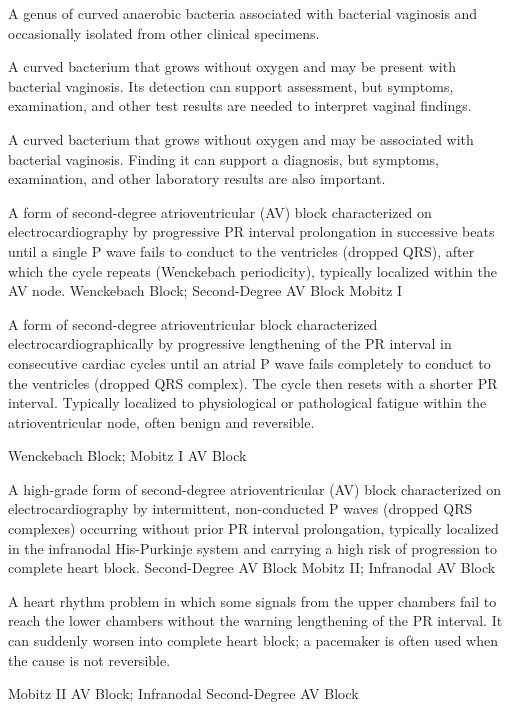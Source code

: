  A genus of curved anaerobic bacteria associated with bacterial vaginosis and occasionally isolated from other clinical specimens.

 A curved bacterium that grows without oxygen and may be present with bacterial vaginosis. Its detection can support assessment, but symptoms, examination, and other test results are needed to interpret vaginal findings.

 A curved bacterium that grows without oxygen and may be associated with bacterial vaginosis. Finding it can support a diagnosis, but symptoms, examination, and other laboratory results are also important.

 A form of second-degree atrioventricular (AV) block characterized on electrocardiography by progressive PR interval prolongation in successive beats until a single P wave fails to conduct to the ventricles (dropped QRS), after which the cycle repeats (Wenckebach periodicity), typically localized within the AV node.
\synonyms
Wenckebach Block; Second-Degree AV Block Mobitz I

 A form of second-degree atrioventricular block characterized electrocardiographically by progressive lengthening of the PR interval in consecutive cardiac cycles until an atrial P wave fails completely to conduct to the ventricles (dropped QRS complex). The cycle then resets with a shorter PR interval. Typically localized to physiological or pathological fatigue within the atrioventricular node, often benign and reversible.

\synonyms
Wenckebach Block; Mobitz I AV Block

 A high-grade form of second-degree atrioventricular (AV) block characterized on electrocardiography by intermittent, non-conducted P waves (dropped QRS complexes) occurring without prior PR interval prolongation, typically localized in the infranodal His-Purkinje system and carrying a high risk of progression to complete heart block.
\synonyms
Second-Degree AV Block Mobitz II; Infranodal AV Block

 A heart rhythm problem in which some signals from the upper chambers fail to reach the lower chambers without the warning lengthening of the PR interval. It can suddenly worsen into complete heart block; a pacemaker is often used when the cause is not reversible.

\synonyms
Mobitz II AV Block; Infranodal Second-Degree AV Block

